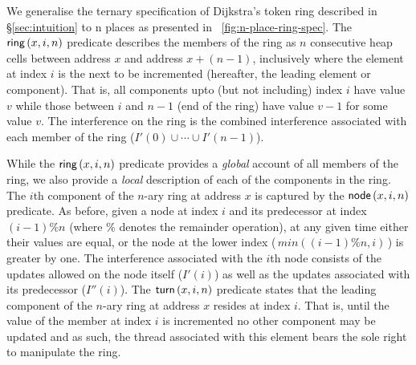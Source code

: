 We generalise the ternary specification of Dijkstra's token ring described in \S\ref{sec:intuition} to n places as presented in \fig~\ref{fig:n-place-ring-spec}. The $\textsf{ring}\left(x,i, n\right)$ predicate describes the members of the ring as $n$ consecutive heap cells between address $x$ and address $x + (n-1)$, inclusively where the element at index $i$ is the next to be incremented (hereafter, the leading element or component). That is, all components upto (but not including) index $i$ have value $v$ while those between $i$ and $n-1$ (end of the ring) have value $v-1$ for some value $v$. The interference on the ring is the combined interference associated with each member of the ring ($I'(0) \cup \cdots \cup I'(n-1)$). 

While the $\textsf{ring}\left(x,i, n\right)$ predicate provides a \emph{global} account of all members of the ring, we also provide a \emph{local} description of each of the components in the ring. The $i$th component of the $n$-ary ring at address $x$ is captured by the $\textsf{node}\left(x,i,n\right)$ predicate. As before, given a node at index $i$ and its predecessor at index $(i-1)\%n$ (where $\%$ denotes the remainder operation), at any given time either their values are equal, or the node at the lower index (\,$min((i-1)\%n, i)$\,) is greater by one. The interference associated with the $i$th node consists of the updates allowed on the node itself ($I'(i)$) as well as the updates associated with its predecessor ($I''(i)$). The $\textsf{turn}\left(x,i,n\right)$ predicate states that the leading component of the $n$-ary ring at address $x$ resides at index $i$. That is, until the value of the member at index $i$ is incremented no other component may be updated and as such, the thread associated with this element bears the sole right to manipulate the ring.

